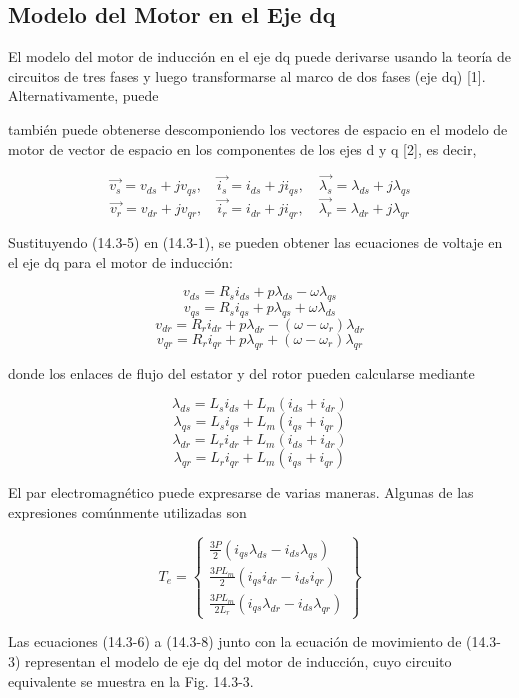 \documentclass[letterpaper,12pt]{article} %
\begin{document}
\subsection{Modelo del Motor en el Eje dq}

El modelo del motor de inducción en el eje dq puede derivarse usando la teoría de circuitos de tres fases y luego transformarse al marco de dos fases (eje dq) [1]. Alternativamente, puede


también puede obtenerse descomponiendo los vectores de espacio en el modelo de motor de vector de espacio en los componentes de los ejes d y q [2], es decir,

\[
\vec{v_s} = v_{ds} + jv_{qs}, \quad \vec{i_s} = i_{ds} + ji_{qs}, \quad \vec{\lambda_s} = \lambda_{ds} + j\lambda_{qs}
\]
\[
\vec{v_r} = v_{dr} + jv_{qr}, \quad \vec{i_r} = i_{dr} + ji_{qr}, \quad \vec{\lambda_r} = \lambda_{dr} + j\lambda_{qr} \tag{14.3-5}
\]

Sustituyendo (14.3-5) en (14.3-1), se pueden obtener las ecuaciones de voltaje en el eje dq para el motor de inducción:

\[
v_{ds} = R_s i_{ds} + p\lambda_{ds} - \omega \lambda_{qs}
\]
\[
v_{qs} = R_s i_{qs} + p\lambda_{qs} + \omega \lambda_{ds}
\]
\[
v_{dr} = R_r i_{dr} + p\lambda_{dr} - (\omega - \omega_r) \lambda_{dr}
\]
\[
v_{qr} = R_r i_{qr} + p\lambda_{qr} + (\omega - \omega_r) \lambda_{qr} \tag{14.3-6}
\]

donde los enlaces de flujo del estator y del rotor pueden calcularse mediante

\[
\lambda_{ds} = L_s i_{ds} + L_m (i_{ds} + i_{dr})
\]
\[
\lambda_{qs} = L_s i_{qs} + L_m (i_{qs} + i_{qr})
\]
\[
\lambda_{dr} = L_r i_{dr} + L_m (i_{ds} + i_{dr})
\]
\[
\lambda_{qr} = L_r i_{qr} + L_m (i_{qs} + i_{qr}) \tag{14.3-7}
\]

El par electromagnético puede expresarse de varias maneras. Algunas de las expresiones comúnmente utilizadas son

\[
T_e = \left\{
\begin{array}{l}
\frac{3P}{2} (i_{qs}\lambda_{ds} - i_{ds}\lambda_{qs}) \\
\frac{3P L_m}{2} (i_{qs} i_{dr} - i_{ds} i_{qr}) \\
\frac{3P L_m}{2L_r} (i_{qs} \lambda_{dr} - i_{ds} \lambda_{qr})
\end{array}
\right\} \tag{14.3-8}
\]

Las ecuaciones (14.3-6) a (14.3-8) junto con la ecuación de movimiento de (14.3-3) representan el modelo de eje dq del motor de inducción, cuyo circuito equivalente se muestra en la Fig. 14.3-3.
\end{document}
